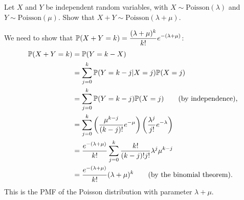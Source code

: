 \begin{exercise}
\begin{questions}

\question
Let $X$ and $Y$ be independent random variables, with $X\sim\text{Poisson}(\lambda)$ and $Y\sim\text{Poisson}(\mu)$. Show that $X+Y\sim\text{Poisson}(\lambda+\mu)$. 
\par
[\slshape Hint. Find the probability $\prob(X+Y=k)$ and use the binomial theorem: $(a+b)^n = \sum_{k=0}^n\binom{n}{k}a^k b^{n-k}$.\normalfont]
\begin{answer}
We need to show that $\displaystyle\mathbb{P}(X+Y=k) = \frac{(\lambda+\mu)^k}{k!}e^{-(\lambda+\mu)}$:
\begin{align*}
\mathbb{P}(X+Y=k)
	& = \mathbb{P}(Y=k-X) \\
	& = \sum_{j=0}^k \mathbb{P}(Y=k-j|X=j)\mathbb{P}(X=j) \\
	& = \sum_{j=0}^k \mathbb{P}(Y=k-j)\mathbb{P}(X=j) \qquad\text{(by independence),} \\
	& = \sum_{j=0}^k \left(\frac{\mu^{k-j}}{(k-j)!}e^{-\mu}\right) \left(\frac{\lambda^j}{j!}e^{-\lambda}\right) \\
	& = \frac{e^{-(\lambda+\mu)}}{k!}\sum_{j=0}^k \frac{k!}{(k-j)!j!}\lambda^{j} \mu^{k-j} \\
	& = \frac{e^{-(\lambda+\mu)}}{k!}(\lambda+\mu)^k \qquad\text{(by the binomial theorem).}
\end{align*}
This is the PMF of the Poisson distribution with parameter $\lambda+\mu$.
\end{answer}


\end{questions}
\end{exercise}
